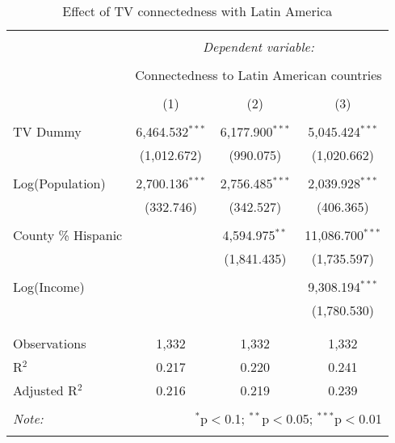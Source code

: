 
\begin{table}[!htbp] \centering 
  \caption{Effect of TV connectedness with Latin America} 
  \label{} 
\begin{tabular}{@{\extracolsep{-5pt}}lccc} 
\\[-1.8ex]\hline 
\hline \\[-1.8ex] 
 & \multicolumn{3}{c}{\textit{Dependent variable:}} \\ 
\cline{2-4} 
\\[-1.8ex] & \multicolumn{3}{c}{Connectedness to Latin American countries} \\ 
\\[-1.8ex] & (1) & (2) & (3)\\ 
\hline \\[-1.8ex] 
 TV Dummy & 6,464.532$^{***}$ & 6,177.900$^{***}$ & 5,045.424$^{***}$ \\ 
  & (1,012.672) & (990.075) & (1,020.662) \\ 
  & & & \\ 
 Log(Population) & 2,700.136$^{***}$ & 2,756.485$^{***}$ & 2,039.928$^{***}$ \\ 
  & (332.746) & (342.527) & (406.365) \\ 
  & & & \\ 
 County \% Hispanic &  & 4,594.975$^{**}$ & 11,086.700$^{***}$ \\ 
  &  & (1,841.435) & (1,735.597) \\ 
  & & & \\ 
 Log(Income) &  &  & 9,308.194$^{***}$ \\ 
  &  &  & (1,780.530) \\ 
  & & & \\ 
\hline \\[-1.8ex] 
Observations & 1,332 & 1,332 & 1,332 \\ 
R$^{2}$ & 0.217 & 0.220 & 0.241 \\ 
Adjusted R$^{2}$ & 0.216 & 0.219 & 0.239 \\ 
\hline 
\hline \\[-1.8ex] 
\textit{Note:}  & \multicolumn{3}{r}{$^{*}$p$<$0.1; $^{**}$p$<$0.05; $^{***}$p$<$0.01} \\ 
 & \multicolumn{3}{r}{} \\ 
\end{tabular} 
\end{table} 
